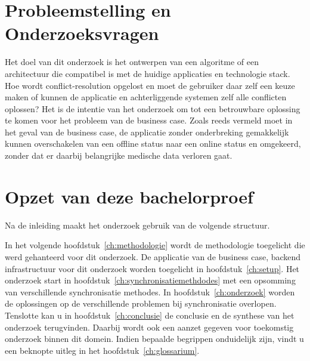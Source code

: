 \section{Probleemstelling en Onderzoeksvragen}
\label{sec:onderzoeksvragen}
Het doel van dit onderzoek is het ontwerpen van een algoritme of een architectuur die compatibel is met de huidige applicaties en technologie stack. Hoe wordt conflict-resolution opgelost en moet de gebruiker daar zelf een keuze maken of kunnen de applicatie en achterliggende systemen zelf alle conflicten oplossen? Het is de intentie van het onderzoek om tot een betrouwbare oplossing te komen voor het probleem van de business case. Zoals reeds vermeld moet in het geval van de business case, de applicatie zonder onderbreking gemakkelijk kunnen overschakelen van een offline status naar een online status en omgekeerd, zonder dat er daarbij belangrijke medische data verloren gaat.

\clearpage
\section{Opzet van deze bachelorproef}
\label{sec:opzet-bachelorproef}

Na de inleiding maakt het onderzoek gebruik van de volgende structuur.

In het volgende hoofdstuk~\ref{ch:methodologie} wordt de methodologie toegelicht die werd gehanteerd voor dit onderzoek. De applicatie van de business case, backend infrastructuur voor dit onderzoek worden toegelicht in hoofdstuk~\ref{ch:setup}. Het onderzoek start in hoofdstuk~\ref{ch:synchronisatiemethdodes} met een opsomming van verschillende synchronisatie methodes. In hoofdstuk~\ref{ch:onderzoek} worden de oplossingen op de verschillende problemen bij synchronisatie overlopen. Tenslotte kan u in hoofdstuk~\ref{ch:conclusie} de conclusie en de synthese van het onderzoek terugvinden. Daarbij wordt ook een aanzet gegeven voor toekomstig onderzoek binnen dit domein. Indien bepaalde begrippen onduidelijk zijn, vindt u een beknopte uitleg in het hoofdstuk~\ref{ch:glossarium}.


